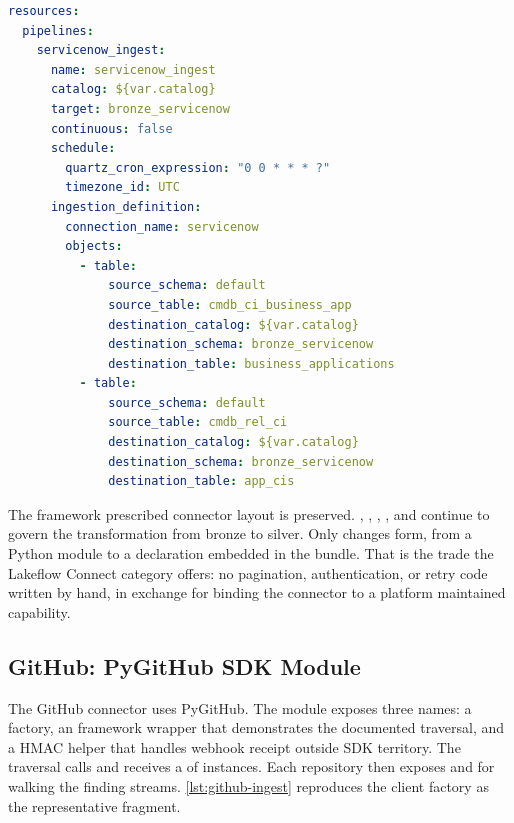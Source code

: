 \begin{lstlisting}[language=yaml,caption={[ServiceNow pipeline bundle fragment]\texttt{src/connectors/servicenow/resources/pipeline.yml}},label={lst:servicenow-pipeline}]
resources:
  pipelines:
    servicenow_ingest:
      name: servicenow_ingest
      catalog: ${var.catalog}
      target: bronze_servicenow
      continuous: false
      schedule:
        quartz_cron_expression: "0 0 * * * ?"
        timezone_id: UTC
      ingestion_definition:
        connection_name: servicenow
        objects:
          - table:
              source_schema: default
              source_table: cmdb_ci_business_app
              destination_catalog: ${var.catalog}
              destination_schema: bronze_servicenow
              destination_table: business_applications
          - table:
              source_schema: default
              source_table: cmdb_rel_ci
              destination_catalog: ${var.catalog}
              destination_schema: bronze_servicenow
              destination_table: app_cis
\end{lstlisting}

The framework prescribed connector layout is preserved. , , , , and  continue to govern the transformation from bronze to silver. Only  changes form, from a Python module to a declaration embedded in the bundle. That is the trade the Lakeflow Connect category offers: no pagination, authentication, or retry code written by hand, in exchange for binding the connector to a platform maintained capability.

\subsection{GitHub: PyGitHub SDK Module}
\label{sec:impl-github-connector}

The GitHub connector uses PyGitHub. The  module exposes three names: a  factory, an  framework wrapper that demonstrates the documented traversal, and a  HMAC helper that handles webhook receipt outside SDK territory. The traversal calls  and receives a  of  instances. Each repository then exposes  and  for walking the finding streams. \autoref{lst:github-ingest} reproduces the client factory as the representative fragment.

